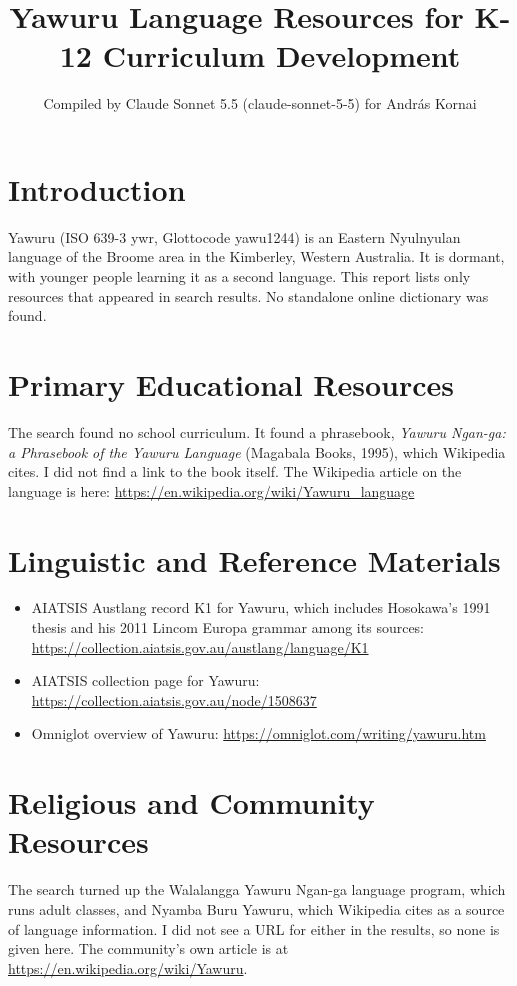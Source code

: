 \documentclass[12pt]{article}
\title{Yawuru Language Resources for K-12 Curriculum Development}
\author{Compiled by Claude Sonnet 5.5 (claude-sonnet-5-5) for Andr\'as Kornai}
\date{}
\begin{document}
\maketitle

\section{Introduction}
Yawuru (ISO 639-3 ywr, Glottocode yawu1244) is an Eastern Nyulnyulan language of the Broome area in the Kimberley, Western Australia. It is dormant, with younger people learning it as a second language. This report lists only resources that appeared in search results. No standalone online dictionary was found.

\section{Primary Educational Resources}
The search found no school curriculum. It found a phrasebook, \emph{Yawuru Ngan-ga: a Phrasebook of the Yawuru Language} (Magabala Books, 1995), which Wikipedia cites. I did not find a link to the book itself. The Wikipedia article on the language is here: \url{https://en.wikipedia.org/wiki/Yawuru_language}

\section{Linguistic and Reference Materials}
\begin{itemize}
\item AIATSIS Austlang record K1 for Yawuru, which includes Hosokawa's 1991 thesis and his 2011 Lincom Europa grammar among its sources: \url{https://collection.aiatsis.gov.au/austlang/language/K1}
\item AIATSIS collection page for Yawuru: \url{https://collection.aiatsis.gov.au/node/1508637}
\item Omniglot overview of Yawuru: \url{https://omniglot.com/writing/yawuru.htm}
\end{itemize}

\section{Religious and Community Resources}
The search turned up the Walalangga Yawuru Ngan-ga language program, which runs adult classes, and Nyamba Buru Yawuru, which Wikipedia cites as a source of language information. I did not see a URL for either in the results, so none is given here. The community's own article is at \url{https://en.wikipedia.org/wiki/Yawuru}.
\end{document}
